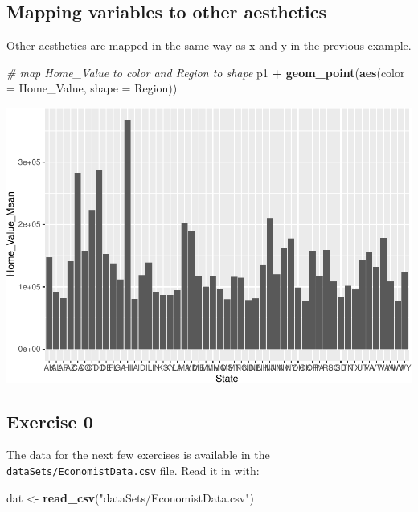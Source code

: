 \documentclass[
]{book}
\newenvironment{Shaded}{\begin{snugshade}}{\end{snugshade}}
\newcommand{\CommentTok}[1]{\textcolor[rgb]{0.56,0.35,0.01}{\textit{#1}}}
\newcommand{\DataTypeTok}[1]{\textcolor[rgb]{0.13,0.29,0.53}{#1}}
\newcommand{\KeywordTok}[1]{\textcolor[rgb]{0.13,0.29,0.53}{\textbf{#1}}}
\newcommand{\NormalTok}[1]{#1}
\newcommand{\OperatorTok}[1]{\textcolor[rgb]{0.81,0.36,0.00}{\textbf{#1}}}
\newcommand{\StringTok}[1]{\textcolor[rgb]{0.31,0.60,0.02}{#1}}
\begin{document}
\hypertarget{mapping-variables-to-other-aesthetics}{%
\subsection{Mapping variables to other aesthetics}\label{mapping-variables-to-other-aesthetics}}

Other aesthetics are mapped in the same way as x and y in the previous example.

\begin{Shaded}
\begin{Highlighting}[]
\CommentTok{\# map \textasciigrave{}Home\_Value\textasciigrave{} to color and \textasciigrave{}Region\textasciigrave{} to shape }
\NormalTok{p1 }\OperatorTok{+}
\StringTok{  }\KeywordTok{geom\_point}\NormalTok{(}\KeywordTok{aes}\NormalTok{(}\DataTypeTok{color =}\NormalTok{ Home\_Value, }\DataTypeTok{shape =}\NormalTok{ Region))}
\end{Highlighting}
\end{Shaded}

\includegraphics{R/Rgraphics/figures/unnamed-chunk-167-1.pdf}

\hypertarget{exercise-0-2}{%
\subsection{Exercise 0}\label{exercise-0-2}}

The data for the next few exercises is available in the \texttt{dataSets/EconomistData.csv} file. Read it in with:

\begin{Shaded}
\begin{Highlighting}[]
\NormalTok{dat \textless{}{-}}\StringTok{ }\KeywordTok{read\_csv}\NormalTok{(}\StringTok{"dataSets/EconomistData.csv"}\NormalTok{)}
\end{Highlighting}
\end{Shaded}
\end{document}
